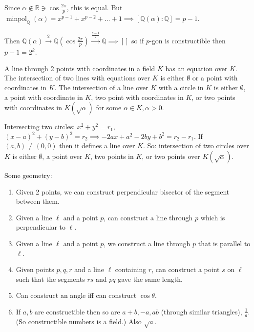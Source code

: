 \documentclass{article}
\newcommand{\R}{\mathbb{R}}
\newcommand{\Q}{\mathbb{Q}}
\theoremstyle{definition}
\theoremstyle{remark}
\begin{document}
Since $\alpha \notin \R \ni \cos \frac{2\pi}{p}$, this is equal. But $\operatorname{minpol}_\Q(\alpha) = x^{p-1} + x^{p-2} + \ldots + 1 \implies [\Q(\alpha): \Q] = p-1$.

Then $\Q(\alpha) \xrightarrow[]{2} \Q\left(\cos \frac{2\pi}{p}\right) \xrightarrow[]{\frac{p-1}{2}} \Q \implies []$ so if $p$-gon is constructible then $p - 1 = 2^k$.

A line through 2 points with coordinates in a field $K$ has an equation over $K$. The intersection of two lines with equations over $K$ is either $\emptyset$ or a point with coordinates in $K$. The intersection of a line over $K$ with a circle in $K$ is either $\emptyset$, a point with coordinate in $K$, two point with coordinates in $K$, or two points with coordinates in $K(\sqrt{\alpha})$ for some $\alpha \in K, \alpha > 0$.

Intersecting two circles:
$x^2 + y^2 = r_1$, $(x-a)^2 + (y-b)^2 = r_2 \implies -2ax + a^2 - 2by + b^2 = r_2 - r_1$.
If $(a, b) \neq (0, 0)$ then it defines a line over $K$. 
So: intersection of two circles over $K$ is either $\emptyset$, a point over $K$, two points in $K$, or two points over $K(\sqrt{\alpha})$.

Some geometry:
\begin{enumerate}
  \item Given 2 points, we can construct perpendicular bisector of the segment between them.
  \item Given a line $\ell$ and a point $p$, can construct a line through $p$ which is perpendicular to $\ell$.
  \item Given a line $\ell$ and a point $p$, we construct a line through $p$ that is parallel to $\ell$.
  \item Given points $p, q, r$ and a line $\ell$ containing $r$, can construct a point $s$ on $\ell$ such that the segments $rs$ and $pq$ gave the same length.
  \item Can construct an angle iff can construct $\cos\theta$.
  \item If $a, b$ are constructible then so are $a + b, -a, ab$ (through similar triangles), $\frac{1}{a}$. (So constructible numbers is a field.) Also $\sqrt{a}$.
\end{enumerate}
\end{document}
